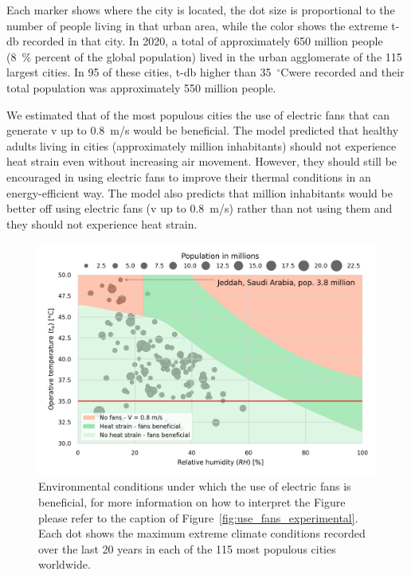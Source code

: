 Each marker shows where the city is located, the dot size is proportional to the number of people living in that urban area, while the color shows the extreme \ac{t-db} recorded in that city.
In 2020, a total of approximately 650 million people (8~\% percent of the global population) lived in the urban agglomerate of the 115 largest cities.
In 95 of these cities, \ac{t-db} higher than 35~$^{\circ}$C\@ were recorded and their total population was approximately 550 million people.

We estimated that  of the most populous cities the use of electric fans that can generate \ac{v} up to 0.8~m/s would be beneficial.
The  model predicted that healthy adults living in  cities (approximately  million inhabitants) should not experience heat strain even without increasing air movement. 
However, they should still be encouraged in using electric fans to improve their thermal conditions in an energy-efficient way.
The model also predicts that  million inhabitants would be better off using electric fans (\ac{v} up to 0.8~m/s) rather than not using them and they should not experience heat strain.

\begin{figure}[hbt!]
    \centering
    \includegraphics[width=\textwidth]{figures/use_fans_and_population}
    \caption{Environmental conditions under which the use of electric fans is beneficial, for more information on how to interpret the Figure please refer to the caption of Figure~\ref{fig:use_fans_experimental}.
    Each dot shows the maximum extreme climate conditions recorded over the last 20 years in each of the 115 most populous cities worldwide.}
    \label{fig:use_fans_and_population}
\end{figure}

